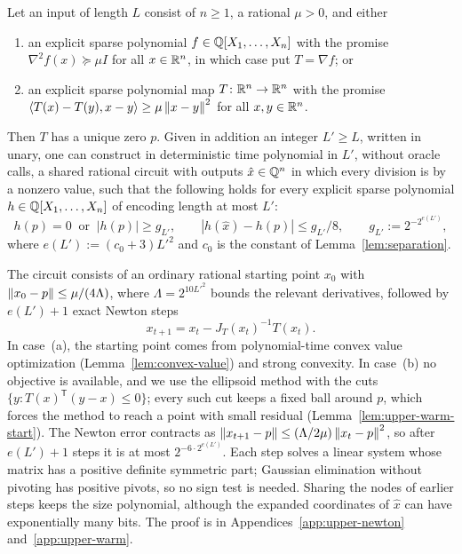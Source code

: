 \begin{lemma}
\label{lem:newton-circuit}
Let an input of length $L$ consist of $n\ge1$, a rational $\mu>0$, and
either
\begin{enumerate}[label=(\alph*)]
\item an explicit sparse polynomial $f\in\mathbb Q[X_1,\ldots,X_n]$ with the
promise $\nabla^2f(x)\succeq\mu I$ for all $x\in\mathbb R^n$, in which case put
$T=\nabla f$; or
\item an explicit sparse polynomial map $T\colon\mathbb R^n\to\mathbb R^n$ with the promise
$\left\langle T(x)-T(y),x-y\right\rangle\ge\mu\left\lVert x-y\right\rVert^2$ for all $x,y\in\mathbb R^n$.
\end{enumerate}
Then $T$ has a unique zero $p$. Given in addition an integer $L'\ge L$,
written in unary, one can construct in deterministic time polynomial in
$L'$, without oracle calls, a shared rational circuit with outputs
$\hat x\in\mathbb Q^n$ in which every division is by a nonzero value, such that the
following holds for every explicit sparse polynomial
$h\in\mathbb Q[X_1,\ldots,X_n]$ of encoding length at most $L'$:
\[
 h(p)=0\ \text{ or }\ |h(p)|\ge g_{L'},
 \qquad
 |h(\hat x)-h(p)|\le g_{L'}/8,
 \qquad
 g_{L'}:=2^{-2^{e(L')}},
\]
where $e(L'):=(c_0+3)L'^2$ and $c_0$ is the constant of
Lemma~\ref{lem:separation}.
\end{lemma}

The circuit consists of an ordinary rational starting point $x_0$ with
$\left\lVert x_0-p\right\rVert\le\mu/(4\Lambda)$, where $\Lambda=2^{10L'^2}$ bounds the
relevant derivatives, followed by $e(L')+1$ exact Newton steps
\[
 x_{t+1}=x_t-J_T(x_t)^{-1}T(x_t).
\]
In case~(a), the starting point comes from polynomial-time convex value
optimization (Lemma~\ref{lem:convex-value}) and strong convexity. In
case~(b) no objective is available, and we use the ellipsoid method with the
cuts $\{y:T(x)^{\mathsf T}(y-x)\le0\}$; every such cut keeps a fixed ball
around $p$, which forces the method to reach a point with small residual
(Lemma~\ref{lem:upper-warm-start}). The Newton error contracts as
$\left\lVert x_{t+1}-p\right\rVert\le(\Lambda/2\mu)\left\lVert x_t-p\right\rVert^2$, so after $e(L')+1$ steps
it is at most $2^{-6\cdot2^{e(L')}}$. Each step solves a linear system whose
matrix has a positive definite symmetric part; Gaussian elimination without
pivoting has positive pivots, so no sign test is needed. Sharing the nodes of
earlier steps keeps the size polynomial, although the expanded coordinates
of $\hat x$ can have exponentially many bits. The proof is in
Appendices~\ref{app:upper-newton} and~\ref{app:upper-warm}.

